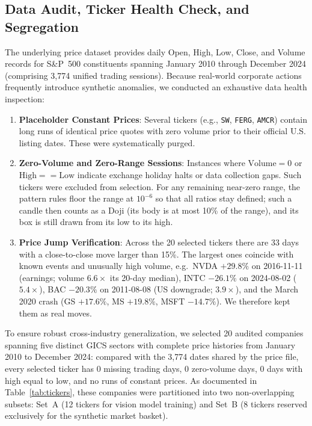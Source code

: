 \documentclass[10pt,journal]{IEEEtran}
\begin{document}
\subsection{Data Audit, Ticker Health Check, and Segregation}
The underlying price dataset provides daily Open, High, Low, Close, and Volume records for S\&P~500 constituents spanning January 2010 through December 2024 (comprising 3,774 unified trading sessions). Because real-world corporate actions frequently introduce synthetic anomalies, we conducted an exhaustive data health inspection:
\begin{enumerate}
  \item \textbf{Placeholder Constant Prices}: Several tickers (e.g., \texttt{SW}, \texttt{FERG}, \texttt{AMCR}) contain long runs of identical price quotes with zero volume prior to their official U.S. listing dates. These were systematically purged.
  \item \textbf{Zero-Volume and Zero-Range Sessions}: Instances where $\text{Volume} = 0$ or $\text{High} == \text{Low}$ indicate exchange holiday halts or data collection gaps. Such tickers were excluded from selection. For any remaining near-zero range, the pattern rules floor the range at $10^{-6}$ so that all ratios stay defined; such a candle then counts as a Doji (its body is at most 10\% of the range), and its box is still drawn from its low to its high.
  \item \textbf{Price Jump Verification}: Across the 20 selected tickers there are 33 days with a close-to-close move larger than 15\%. The largest ones coincide with known events and unusually high volume, e.g.\ NVDA $+29.8\%$ on 2016-11-11 (earnings; volume $6.6\times$ its 20-day median), INTC $-26.1\%$ on 2024-08-02 ($5.4\times$), BAC $-20.3\%$ on 2011-08-08 (US downgrade; $3.9\times$), and the March 2020 crash (GS $+17.6\%$, MS $+19.8\%$, MSFT $-14.7\%$). We therefore kept them as real moves.
\end{enumerate}

To ensure robust cross-industry generalization, we selected 20 audited companies spanning five distinct GICS sectors with complete price histories from January 2010 to December 2024: compared with the 3,774 dates shared by the price file, every selected ticker has 0 missing trading days, 0 zero-volume days, 0 days with high equal to low, and no runs of constant prices. As documented in Table~\ref{tab:tickers}, these companies were partitioned into two non-overlapping subsets: Set~A (12 tickers for vision model training) and Set~B (8 tickers reserved exclusively for the synthetic market basket).
\end{document}
